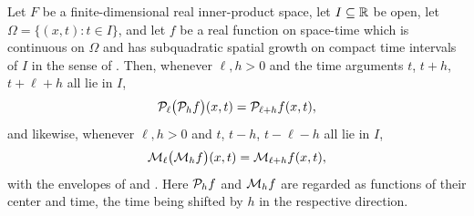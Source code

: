 \begin{lemma}
Let $F$ be a finite-dimensional real inner-product space, let $I\subseteq\mathbb{R}$ be
open, let $\Omega=\{(x,t):t\in I\}$, and let $f$ be a real function on space-time
which is continuous on $\Omega$ and has subquadratic spatial growth on compact
time intervals of $I$ in the sense of . Then,
whenever $\ell,h>0$ and the time arguments $t$, $t+h$, $t+\ell+h$ all lie in
$I$,
\begin{equation}\label{eq:envelope-composition}
  \mathcal{P}_\ell\bigl(\mathcal{P}_hf\bigr)(x,t)=\mathcal{P}_{\ell+h}f(x,t),
\end{equation}
and likewise, whenever $\ell,h>0$ and $t$, $t-h$, $t-\ell-h$ all lie in $I$,
\[
  \mathcal{M}_\ell\bigl(\mathcal{M}_hf\bigr)(x,t)=\mathcal{M}_{\ell+h}f(x,t),
\]
with the envelopes of  and . Here
$\mathcal{P}_hf$ and $\mathcal{M}_hf$ are regarded as functions of their center and time,
the time being shifted by $h$ in the respective direction.
\end{lemma}
